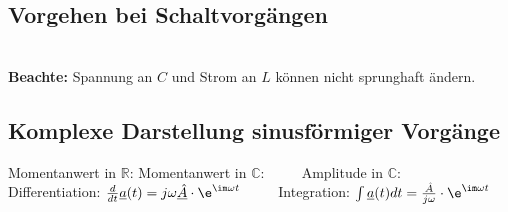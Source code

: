    		\subsection{Vorgehen bei Schaltvorgängen}
   		 $\qquad$\\
   		 \textbf{Beachte:} Spannung an $C$ und Strom an $L$ können nicht sprunghaft ändern.

	\subsection{Komplexe Darstellung sinusförmiger Vorgänge}
		Momentanwert in $\mathbb{R}$:  \qquad
		Momentanwert in $\mathbb{C}$:  $\qquad$ 
		Amplitude in $\mathbb{C}$: \\
		
		Differentiation: $\frac{d}{dt} \underline{a}(t) = j \omega \underline{\hat{A}}\cdot \e^{\im \omega t}$ $\qquad$ 
		Integration: $\int \underline{a}(t) dt = \frac{\hat{A}}{j \omega}\cdot \e^{\im \omega t}$

